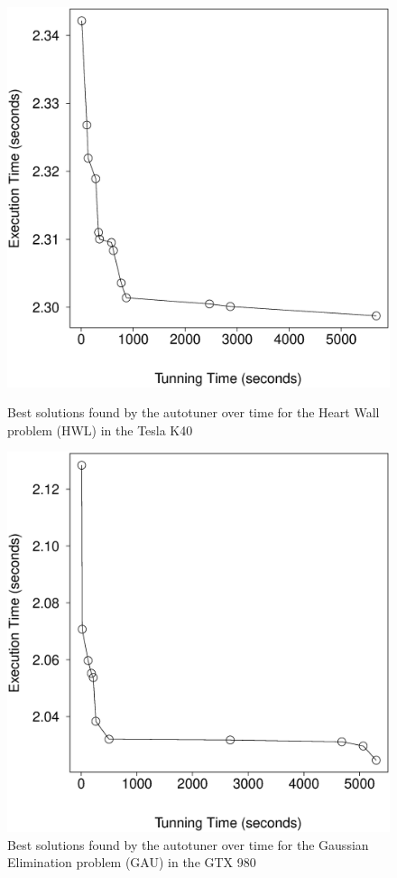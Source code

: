 \begin{figure}[htpb]
    \centering
    \begin{minipage}{.48\textwidth}
        \centering
        \includegraphics[scale=.22]{./images/heartwall-0-Tesla-K40-Best.eps}
        \caption{Best solutions found by the autotuner over time for the Heart Wall problem (HWL) in the Tesla K40}
        \label{fig:K40hwBest}
    \end{minipage}%
    \hfill
    \begin{minipage}{.48\textwidth}
        \centering
        \includegraphics[scale=.22]{./images/gaussian-0-GTX-980-Best.eps}
        \caption{Best solutions found by the autotuner over time for the Gaussian Elimination problem (GAU) in the GTX 980}
        \label{fig:980gauBest}
    \end{minipage}%


\end{figure}
